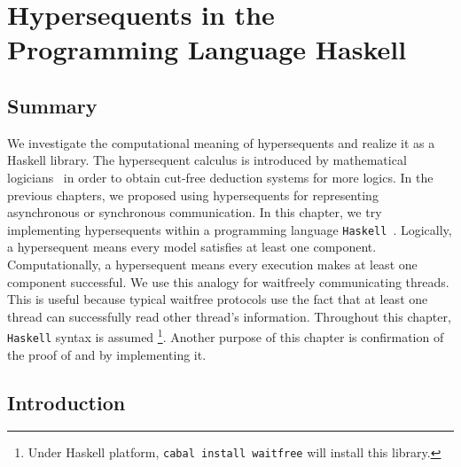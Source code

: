 \chapter{Hypersequents in the Programming Language Haskell}
\label{ch:haskell}

\section{Summary}

 We investigate the computational meaning of hypersequents and realize
 it as a Haskell library.
 The hypersequent calculus is introduced by mathematical
 logicians~\citep{avron91,alg,metcalfe2006} in order
 to obtain cut-free deduction systems for more logics.
 In the previous chapters, we proposed using hypersequents
 for representing asynchronous or synchronous communication.
 In this chapter, we try implementing hypersequents within a programming
 language \texttt{Haskell}~\citep{marlow2010haskell}.
 Logically, a hypersequent
 means every model satisfies at least one component.
 Computationally, a hypersequent
 means every execution makes at least one component
 successful.
 We use this analogy
 for waitfreely communicating threads.  This is useful
 because typical waitfree protocols use the fact that at least one thread
 can successfully read other thread's information.
 Throughout this chapter, \texttt{Haskell} syntax is assumed%
 \footnote{Under Haskell platform,
 \texttt{cabal install waitfree} will install this library.}.
 Another purpose of this chapter is confirmation of the proof of
  and  by implementing it.

\iffalse
\begin{code}
 {-# LANGUAGE TypeOperators, MultiParamTypeClasses, FunctionalDependencies, FlexibleInstances, UndecidableInstances #-}

module Control.Concurrent.Waitfree
    ( ZeroT
    , SucT
    , HNil
    , HCons
    , (:*:)
    , K
    , single
    , Thread (t, atid)
    , AbstractThreadId
    , peek
    , comm
    , follows
    , execute
    , choice
    , cycling
    , exchange
    , (-*-)
    )
    where

import Control.Concurrent (ThreadId, forkIO, killThread)
import Control.Concurrent.MVar (MVar, tryPutMVar, readMVar,
 newEmptyMVar, tryTakeMVar)
import qualified Data.Map as Map
\end{code}
\fi

\section{Introduction}

